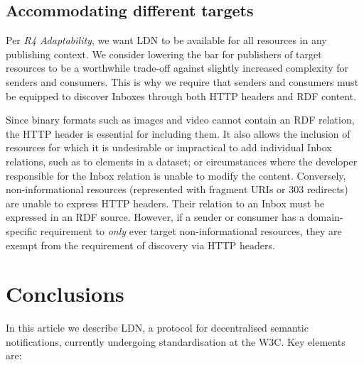 \documentclass[a4paper]{llncs}
\begin{document}
                            

                            
                                \subsection{Accommodating different targets}
  \label{accommodating-different-targets}

                                
                                    
\par Per {\em R4 Adaptability}, we want LDN to be available for all resources in any publishing context. We consider lowering the bar for publishers of target resources to be a worthwhile trade-off against slightly increased complexity for senders and consumers. This is why we require that senders and consumers must be equipped to discover Inboxes through both HTTP headers and RDF content. 

                                    
\par Since binary formats such as images and video cannot contain an RDF relation, the HTTP header is essential for including them. It also allows the inclusion of resources for which it is undesirable or impractical to add individual Inbox relations, such as to elements in a dataset; or circumstances where the developer responsible for the Inbox relation is unable to modify the content. Conversely, non-informational resources (represented with fragment URIs or 303 redirects) are unable to express HTTP headers. Their relation to an Inbox must be expressed in an RDF source. However, if a sender or consumer has a domain-specific requirement to {\em only} ever target non-informational resources, they are exempt from the requirement of discovery via HTTP headers.
                                
                            
                        
                    

                    
                        \section{Conclusions}
  \label{conclusions}

                        
                            
\par In this article we describe LDN, a protocol for decentralised semantic notifications, currently undergoing standardisation at the W3C. Key elements are:
\end{document}
